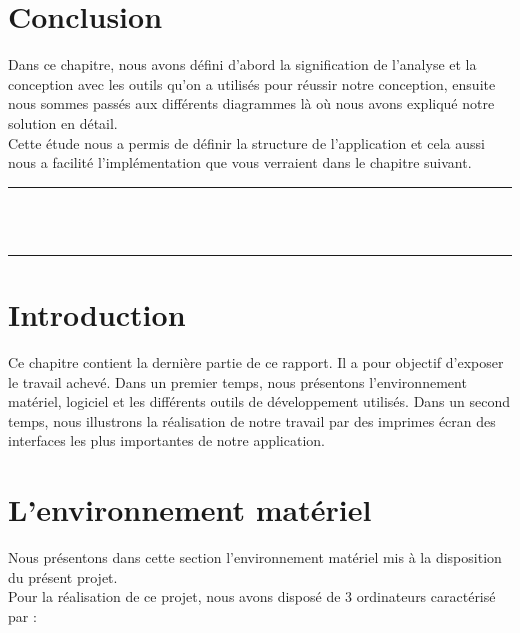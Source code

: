 \documentclass[12pt]{report}
\begin{document}
\newpage

\section{Conclusion}
\hspace*{0.16in}
Dans ce chapitre, nous avons défini d’abord la signification de l’analyse et la conception avec les outils qu’on a utilisés pour réussir notre conception, ensuite nous sommes passés aux différents diagrammes là où nous avons expliqué notre solution en détail. 
\\
\hspace*{0.16in}
Cette étude nous a permis de définir la structure de l’application et cela aussi nous a facilité l’implémentation que vous verraient dans le chapitre suivant.

\newpage

\vspace*{\fill}
\begin{center}
    {\color{Black} \rule{\linewidth}{1.2mm} }\\
\vspace{0.25in}
    {\centering{}}
\vspace{0.35in}\\
    {\color{Black} \rule{\linewidth}{1.2mm} }
\end{center}
\vspace*{\fill}
\setcounter{section}{0}

\newpage

\section{Introduction}
\vspace{0.2in}
\hspace*{0.16in}
Ce chapitre contient la dernière partie de ce rapport. Il a pour objectif d’exposer le travail achevé. Dans un premier temps, nous présentons l’environnement matériel, logiciel et les différents outils de développement utilisés. Dans un second temps, nous illustrons la réalisation de notre travail par des imprimes écran des interfaces les plus importantes de notre application.

\section{L’environnement matériel}
\vspace{0.1in}
\hspace*{0.16in}
Nous présentons dans cette section l’environnement matériel mis à la disposition du présent projet.
\\
Pour la réalisation de ce projet, nous avons disposé de 3 ordinateurs caractérisé par :
\end{document}
